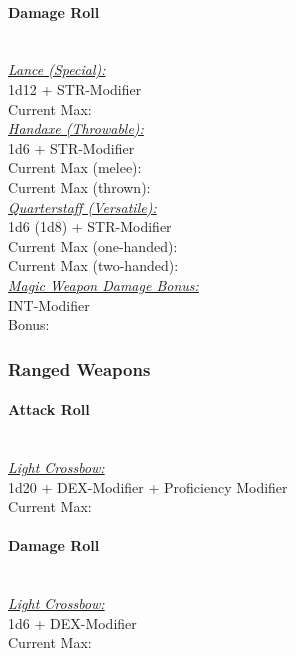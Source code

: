 \documentclass[letterpaper,openany,oneside,twocolumn]{book}
\begin{document}
\paragraph*{Damage Roll}\hfill\\
\underline{\textit{Lance (Special):}}\\
1d12 + STR-Modifier\\
\indent Current Max: 
\\
\underline{\textit{Handaxe (Throwable):}}\\
1d6 + STR-Modifier\\
\indent Current Max (melee): \\
\indent Current Max (thrown): 
\\
\underline{\textit{Quarterstaff (Versatile):}}\\
1d6 (1d8) + STR-Modifier\\
\indent Current Max (one-handed): \\
\indent Current Max (two-handed): 
\\
\underline{\textit{Magic Weapon Damage Bonus:}}\\
INT-Modifier\\
\indent Bonus: \calculateModifier{\IntelligenceScoreValue}
\subsubsection*{Ranged Weapons}
\paragraph*{Attack Roll}\hfill\\
\underline{\textit{Light Crossbow:}}\\
1d20 + DEX-Modifier + Proficiency Modifier\\
\indent Current Max: 
\paragraph*{Damage Roll}\hfill\\
\underline{\textit{Light Crossbow:}}\\
1d6 + DEX-Modifier\\
\indent Current Max: 
\end{document}
